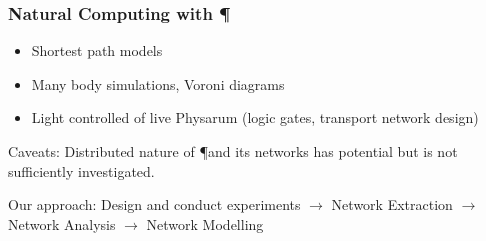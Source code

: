 \documentclass[	hyperref={pdfpagelabels=false}, xcolor=dvipsnames,
		11pt]{beamer}
\begin{document}
\begin{frame}
    \frametitle{Natural Computing with \P} 



	\begin{itemize}
	  \item Shortest path models
	  \item Many body simulations, Voroni diagrams
	  \item Light controlled of live Physarum (logic gates, transport network design)
	\end{itemize}  


	\begin{block}{Caveats:}
		Distributed nature of \P and its networks has potential but is not sufficiently investigated.
	\end{block}

	\begin{alertblock}{Our approach:}
		Design and conduct experiments $\longrightarrow$ Network Extraction $\longrightarrow$  Network Analysis $\longrightarrow$  Network Modelling
	\end{alertblock}

\end{frame}
\end{document}
